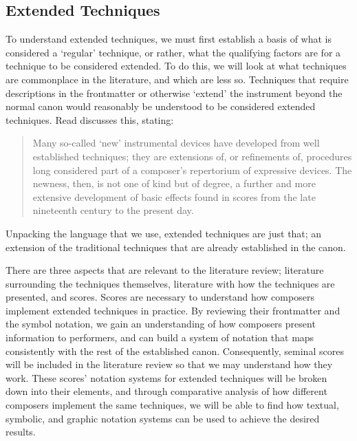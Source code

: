 \subsection{Extended Techniques}
To understand extended techniques, we must first establish a basis of what is considered a `regular' technique, or rather, what the qualifying factors are for a technique to be considered extended.
To do this, we will look at what techniques are commonplace in the literature, and which are less so.
Techniques that require descriptions in the frontmatter or otherwise `extend' the instrument beyond the normal canon would reasonably be understood to be considered extended techniques.
Read discusses this, stating:
\begin{quotation}
    Many so-called ‘new’ instrumental devices have developed from well established techniques; they are extensions of, or refinements of, procedures long considered part of a composer’s repertorium of expressive devices. 
    The newness, then, is not one of kind but of degree, a further and more extensive development of basic effects found in scores from the late nineteenth century to the present day.\autocite[3]{readContemporaryInstrumentalTechniques1976}
\end{quotation}
Unpacking the language that we use, extended techniques are just that; an extension of the traditional techniques that are already established in the canon. 

There are three aspects that are relevant to the literature review; literature surrounding the techniques themselves, literature with how the techniques are presented, and scores. 
Scores are necessary to understand how composers implement extended techniques in practice.
By reviewing their frontmatter and the symbol notation, we gain an understanding of how composers present information to performers, and can build a system of notation that maps consistently with the rest of the established canon.
Consequently, seminal scores will be included in the literature review so that we may understand how they work. 
These scores' notation systems for extended techniques will be broken down into their elements, and through comparative analysis of how different composers implement the same techniques, we will be able to find how textual, symbolic, and graphic notation systems can be used to achieve the desired results.

